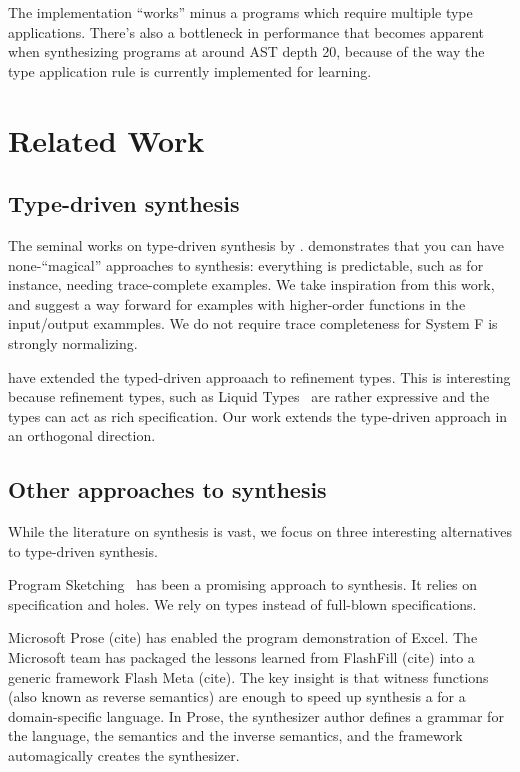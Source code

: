 \documentclass[acmsmall]{acmart}
\theoremstyle{mytheoremstyle}
\begin{document}
The implementation ``works'' minus a programs which require multiple type applications. There's also a bottleneck in performance that becomes apparent when synthesizing programs at around AST depth 20, because of the way the type application rule is currently implemented for learning.

\section{Related Work}

\subsection{Type-driven synthesis}

The seminal works on type-driven synthesis by \citet{osera2015program}. demonstrates that you can have none-``magical'' approaches to synthesis: everything is predictable, such as for instance, needing trace-complete examples. We take inspiration from this work, and suggest a way forward for examples with higher-order functions in the input/output exammples. We do not require trace completeness for System F is strongly normalizing.

\citet{polikarpova2016program} have extended the typed-driven approaach to refinement types. This is interesting because refinement types, such as Liquid Types~\cite{lrondon2012liquid} are rather expressive and the types can act as rich specification. Our work extends the type-driven approach in an orthogonal direction.

\subsection{Other approaches to synthesis}

While the literature on synthesis is vast, we focus on three interesting alternatives to type-driven synthesis.

Program Sketching~\cite{solar2008program} has been a promising approach to synthesis. It relies on specification and holes. We rely on types instead of full-blown specifications.

Microsoft Prose (cite) has enabled the program demonstration of
Excel. The Microsoft team has packaged the lessons learned from
FlashFill (cite) into a generic framework Flash Meta (cite). The key
insight is that witness functions (also known as reverse semantics)
are enough to speed up synthesis a for a domain-specific language. In
Prose, the synthesizer author defines a grammar for the language, the
semantics and the inverse semantics, and the framework automagically
creates the synthesizer.
\end{document}
